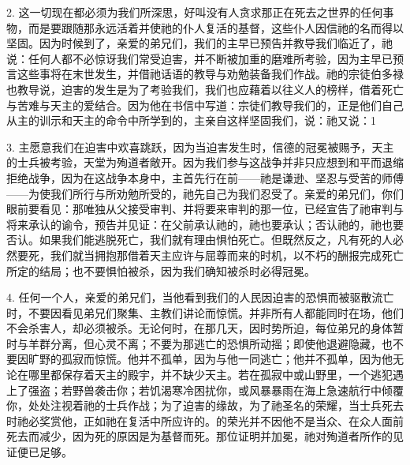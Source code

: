 2. 这一切现在都必须为我们所深思，好叫没有人贪求那正在死去之世界的任何事物，而是要跟随那永远活着并使祂的仆人复活的基督，这些仆人因信祂的名而得以坚固。因为时候到了，亲爱的弟兄们，我们的主早已预告并教导我们临近了，祂说：任何人都不必惊讶我们常受迫害，并不断被加重的磨难所考验，因为主早已预言这些事将在末世发生，并借祂话语的教导与劝勉装备我们作战。祂的宗徒伯多禄也教导说，迫害的发生是为了考验我们，我们也应藉着以往义人的榜样，借着死亡与苦难与天主的爱结合。因为他在书信中写道：宗徒们教导我们的，正是他们自己从主的训示和天主的命令中所学到的，主亲自这样坚固我们，说：祂又说：1\par

3. 主愿意我们在迫害中欢喜跳跃，因为当迫害发生时，信德的冠冕被赐予，天主的士兵被考验，天堂为殉道者敞开。因为我们参与这战争并非只应想到和平而退缩拒绝战争，因为在这战争本身中，主首先行在前——祂是谦逊、坚忍与受苦的师傅——为使我们所行与所劝勉所受的，祂先自己为我们忍受了。亲爱的弟兄们，你们眼前要看见：那唯独从父接受审判、并将要来审判的那一位，已经宣告了祂审判与将来承认的谕令，预告并见证：在父前承认祂的，祂也要承认；否认祂的，祂也要否认。如果我们能逃脱死亡，我们就有理由惧怕死亡。但既然反之，凡有死的人必然要死，我们就当拥抱那借着天主应许与屈尊而来的时机，以不朽的酬报完成死亡所定的结局；也不要惧怕被杀，因为我们确知被杀时必得冠冕。\par

4. 任何一个人，亲爱的弟兄们，当他看到我们的人民因迫害的恐惧而被驱散流亡时，不要因看见弟兄们聚集、主教们讲论而惊慌。\newline{}并非所有人都能同时在场，他们不会杀害人，却必须被杀。无论何时，在那几天，因时势所迫，每位弟兄的身体暂时与羊群分离，但心灵不离；不要为那逃亡的恐惧所动摇；即使他退避隐藏，也不要因旷野的孤寂而惊慌。他并不孤单，因为与他一同逃亡；他并不孤单，因为他无论在哪里都保存着天主的殿宇，并不缺少天主。若在孤寂中或山野里，一个逃犯遇上了强盗；若野兽袭击你；若饥渴寒冷困扰你，或风暴暴雨在海上急速航行中倾覆你，处处注视着祂的士兵作战；为了迫害的缘故，为了祂圣名的荣耀，当士兵死去时祂必奖赏他，正如祂在复活中所应许的。的荣光并不因他不是当众、在众人面前死去而减少，因为死的原因是为基督而死。那位证明并加冕，祂对殉道者所作的见证便已足够。\par

